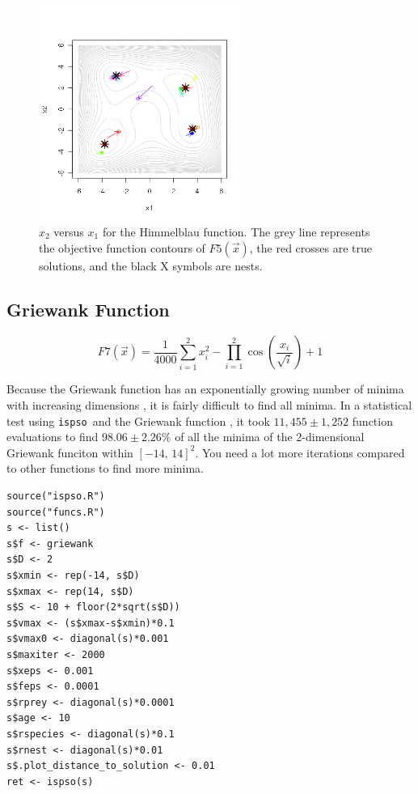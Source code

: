 \documentclass{article}
\def\ispso{\texttt{ispso}}
\begin{document}
\begin{figure}[htbp]
  \centering
  \includegraphics[width=0.6\textwidth]{himmelblau.png}
  \caption{$x_2$ versus $x_1$ for the Himmelblau function. The grey line represents the objective function contours of $F5(\vec{x})$, the red crosses are true solutions, and the black X symbols are nests.}
\end{figure}

\subsection{Griewank Function}

\begin{equation*}
  F7(\vec{x})=
    \frac{1}{4000}\sum_{i=1}^2x_i^2
    -\prod_{i=1}^2\cos\left(\frac{x_i}{\sqrt{i}}\right)+1
\end{equation*}

Because the Griewank function has an exponentially growing number of minima with increasing dimensions \citep{Cho.ea.2008}, it is fairly difficult to find all minima.
In a statistical test using \ispso\ and the Griewank function \citep{Cho.2008}, it took $11,455\pm 1,252$ function evaluations to find $98.06\pm 2.26\%$ of all the minima of the 2-dimensional Griewank funciton within $[-14,\,14]^2$.
You need a lot more iterations compared to other functions to find more minima.

\begin{verbatim}
source("ispso.R")
source("funcs.R")
s <- list()
s$f <- griewank
s$D <- 2
s$xmin <- rep(-14, s$D)
s$xmax <- rep(14, s$D)
s$S <- 10 + floor(2*sqrt(s$D))
s$vmax <- (s$xmax-s$xmin)*0.1
s$vmax0 <- diagonal(s)*0.001
s$maxiter <- 2000
s$xeps <- 0.001
s$feps <- 0.0001
s$rprey <- diagonal(s)*0.0001
s$age <- 10
s$rspecies <- diagonal(s)*0.1
s$rnest <- diagonal(s)*0.01
s$.plot_distance_to_solution <- 0.01
ret <- ispso(s)
\end{verbatim}
\end{document}
